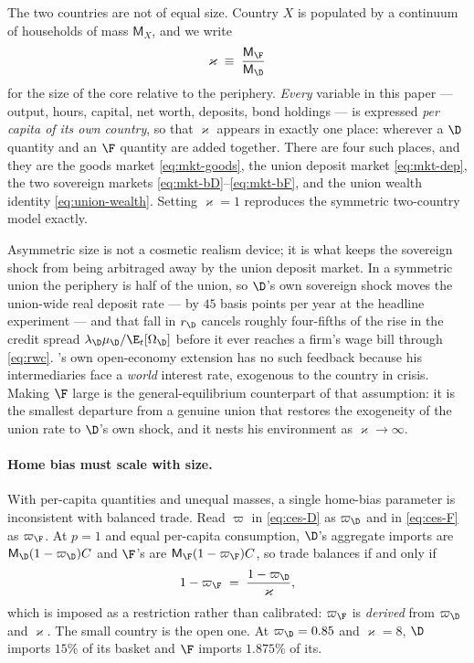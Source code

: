 The two countries are not of equal size. Country $X$ is populated by a continuum
of households of mass $\mathsf{M}_X$, and we write
\begin{equation}
\varkappa\;\equiv\;\frac{\mathsf{M}_\F}{\mathsf{M}_\D}
\label{eq:size-ratio}
\end{equation}
for the size of the core relative to the periphery. \emph{Every} variable in this
paper --- output, hours, capital, net worth, deposits, bond holdings --- is
expressed \emph{per capita of its own country}, so that $\varkappa$ appears in
exactly one place: wherever a $\D$ quantity and an $\F$ quantity are added
together. There are four such places, and they are the goods market
\eqref{eq:mkt-goods}, the union deposit market \eqref{eq:mkt-dep}, the two
sovereign markets \eqref{eq:mkt-bD}--\eqref{eq:mkt-bF}, and the union wealth
identity \eqref{eq:union-wealth}. Setting $\varkappa=1$ reproduces the symmetric
two-country model exactly.

Asymmetric size is not a cosmetic realism device; it is what keeps the sovereign
shock from being arbitraged away by the union deposit market. In a symmetric
union the periphery is half of the union, so $\D$'s own sovereign shock moves the
union-wide real deposit rate --- by $45$ basis points per year at the headline
experiment --- and that fall in $r_\D$ cancels roughly four-fifths of the rise in
the credit spread $\lambda_\D\mu_\D/\E_t[\Omega_\D]$ before it ever reaches a
firm's wage bill through \eqref{eq:rwc}. \citet{bocola2016pass}'s own
open-economy extension has no such feedback because his intermediaries face a
\emph{world} interest rate, exogenous to the country in crisis. Making $\F$ large
is the general-equilibrium counterpart of that assumption: it is the smallest
departure from a genuine union that restores the exogeneity of the union rate to
$\D$'s own shock, and it nests his environment as $\varkappa\to\infty$.

\paragraph{Home bias must scale with size.} With per-capita quantities and
unequal masses, a single home-bias parameter is inconsistent with balanced trade.
Read $\varpi$ in \eqref{eq:ces-D} as $\varpi_\D$ and in \eqref{eq:ces-F} as
$\varpi_\F$. At $p=1$ and equal per-capita consumption, $\D$'s aggregate imports
are $\mathsf{M}_\D(1-\varpi_\D)C$ and $\F$'s are $\mathsf{M}_\F(1-\varpi_\F)C$,
so trade balances if and only if
\begin{equation}
1-\varpi_\F\;=\;\frac{1-\varpi_\D}{\varkappa},
\label{eq:home-bias-size}
\end{equation}
which is imposed as a restriction rather than calibrated: $\varpi_\F$ is
\emph{derived} from $\varpi_\D$ and $\varkappa$. The small country is the open
one. At $\varpi_\D=0.85$ and $\varkappa=8$, $\D$ imports $15\%$ of its basket and
$\F$ imports $1.875\%$ of its.


